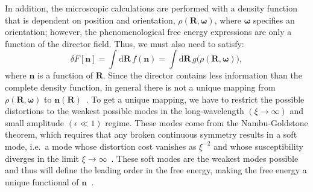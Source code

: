 In addition, the microscopic calculations are performed with a density function that is dependent on position and orientation, $\rho(\mathbf{R},\mathbf{\omega})$, where $\mathbf{\omega}$ specifies an orientation; however, the phenomenological free energy expressions are only a function of the director field.
Thus, we must also need to satisfy:
\begin{equation}
  \delta F[\mathbf{n}] = \int \textrm{d} \mathbf{R} \, f(\mathbf{n}) = \int \textrm{d} \mathbf{R} \, g \big ( \rho(\mathbf{R},\mathbf{\omega}) \big),\label{e:2-LessInfo}
\end{equation}
where $\mathbf{n}$ is a function of $\mathbf{R}$.
Since the director contains less information than the complete density function, in general there is not a unique mapping from  $\rho(\mathbf{R},\mathbf{\omega})$ to $\mathbf{n}(\mathbf{R})$~\cite{RN55}.
To get a unique mapping, we have to restrict the possible distortions to the weakest possible modes in the long-wavelength $(\xi \rightarrow \infty)$ and small amplitude $(\epsilon \ll 1)$ regime.
These modes come from the Nambu-Goldstone theorem, which requires that any broken continuous symmetry results in a soft mode, i.e.\ a mode whose distortion cost vanishes as $\xi^{-2}$ and whose susceptibility diverges in the limit $\xi \rightarrow \infty$~\cite{RN175,RN226,RN227,RN228}.
These soft modes are the weakest modes possible and thus will define the leading order in the free energy, making the free energy a unique functional of $\mathbf{n}$~\cite{RN55}. \\

